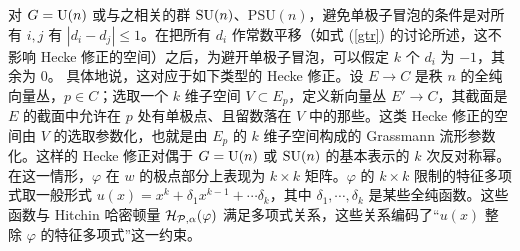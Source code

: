 对 $G={\mathrm U}(n)$ 或与之相关的群 ${\mathrm{SU}}(n)$、$\mathrm{PSU}(n)$，避免单极子冒泡的条件是对所有 $i,j$ 有 $|d_i-d_j|\leq 1$。在把所有 $d_i$ 作常数平移（如式 (\ref{gtr}) 的讨论所述，这不影响 Hecke 修正的空间）之后，为避开单极子冒泡，可以假定 $k$ 个 $d_i$ 为 $-1$，其余为 $0$。
具体地说，这对应于如下类型的 Hecke 修正。设 $E\to C$ 是秩 $n$ 的全纯向量丛，$p\in C$；选取一个 $k$ 维子空间 $V\subset E_p$，定义新向量丛 $E'\to C$，其截面是 $E$ 的截面中允许在 $p$ 处有单极点、且留数落在 $V$ 中的那些。这类 Hecke 修正的空间由 $V$ 的选取参数化，也就是由 $E_p$ 的 $k$ 维子空间构成的 Grassmann 流形参数化。这样的 Hecke 修正对偶于 $G={\mathrm U}(n)$ 或 ${\mathrm{SU}}(n)$ 的基本表示的 $k$ 次反对称幂。
在这一情形，$\varphi$ 在 $w$ 的极点部分上表现为 $k \times k$ 矩阵。$\varphi$ 的 $k \times k$ 限制的特征多项式取一般形式 $u(x) = x^k + \delta_1 x^{k-1} + \cdots \delta_k$，其中 $\delta_1,\cdots, \delta_k$ 是某些全纯函数。这些函数与 Hitchin 哈密顿量 ${\mathcal H}_{{\mathcal P},\alpha}(\varphi)$ 满足多项式关系，这些关系编码了“$u(x)$ 整除 $\varphi$ 的特征多项式”这一约束。




